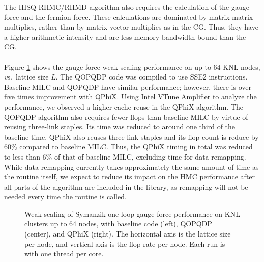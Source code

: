 \documentclass[epj]{webofc}
\begin{document}
The HISQ RHMC/RHMD algorithm also requires the calculation of the gauge force and the fermion force. 
These calculations are dominated by matrix-matrix multiplies,  rather than
by  matrix-vector multiplies as in the CG. 
Thus, they have a higher arithmetic intensity and are less memory 
bandwidth bound than the CG. \\
\\
\noindent{}Figure \ref{Fig.6} shows the gauge-force weak-scaling performance on up to 64 KNL nodes, {\emph vs}.~lattice size $L$. 
The QOPQDP code was compiled to use SSE2 instructions.
Baseline MILC and QOPQDP have similar performance; however, there is 
over five times improvement with QPhiX. 
Using Intel VTune Amplifier to analyze the performance,
we observed a higher cache reuse in the QPhiX algorithm. %
The QOPQDP algorithm also requires fewer flops than baseline MILC by virtue of 
reusing three-link staples.
Its time was reduced to around one third of the baseline time. 
QPhiX also reuses three-link staples and its flop count is reduce by
$60\%$ compared to baseline MILC.  
Thus, the QPhiX timing in total was reduced to less than $6\%$ of that of baseline
MILC, excluding time for data remapping. 
While data remapping currently takes approximately the same amount 
of time as the routine itself, 
we expect to reduce its impact on the HMC performance after all parts of
the algorithm are included in the library, as remapping will not be 
needed every time the routine is called. \\

\begin{figure}[tp]
   \centering
    \hspace{0.3cm} %
    \hspace{0.3cm} 
   \caption{Weak scaling of Symanzik one-loop gauge force performance on KNL clusters up to 64 nodes, with baseline code (left), QOPQDP (center), and QPhiX (right). 
   The horizontal axis is the lattice size per node, and vertical axis is the flop rate per node. 
   Each run is with one thread per core. 
   }
   \label{Fig.6}
\end{figure}
\end{document}
